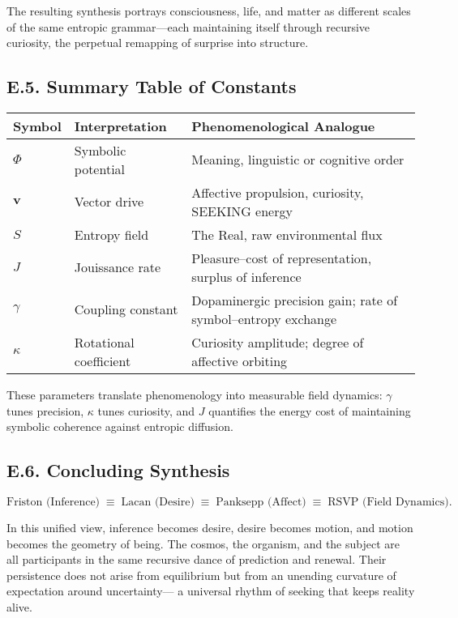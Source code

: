 \documentclass[12pt,a4paper]{article}
\begin{document}
The resulting synthesis portrays consciousness, life, and matter as different scales of the same entropic grammar—each maintaining itself through recursive curiosity, the perpetual remapping of surprise into structure.

\subsection*{E.5. Summary Table of Constants}

\begin{center}
\renewcommand{\arraystretch}{1.25}
\begin{tabular}{@{}p{3cm}p{6cm}p{6cm}@{}}
\toprule
\textbf{Symbol} & \textbf{Interpretation} & \textbf{Phenomenological Analogue} \\
\midrule
$\Phi$ & Symbolic potential & Meaning, linguistic or cognitive order \\
$\mathbf{v}$ & Vector drive & Affective propulsion, curiosity, SEEKING energy \\
$S$ & Entropy field & The Real, raw environmental flux \\
$J$ & Jouissance rate & Pleasure–cost of representation, surplus of inference \\
$\gamma$ & Coupling constant & Dopaminergic precision gain; rate of symbol–entropy exchange \\
$\kappa$ & Rotational coefficient & Curiosity amplitude; degree of affective orbiting \\
\bottomrule
\end{tabular}
\end{center}

These parameters translate phenomenology into measurable field dynamics: $\gamma$ tunes precision, $\kappa$ tunes curiosity, and $J$ quantifies the energy cost of maintaining symbolic coherence against entropic diffusion.

\subsection*{E.6. Concluding Synthesis}

\[
\boxed{
\text{Friston (Inference)} \;\equiv\;
\text{Lacan (Desire)} \;\equiv\;
\text{Panksepp (Affect)} \;\equiv\;
\text{RSVP (Field Dynamics)}.
}
\]

\noindent
In this unified view, inference becomes desire, desire becomes motion, and motion becomes the geometry of being.
The cosmos, the organism, and the subject are all participants in the same recursive dance of prediction and renewal.
Their persistence does not arise from equilibrium but from an unending curvature of expectation around uncertainty—
a universal rhythm of seeking that keeps reality alive.
\end{document}

